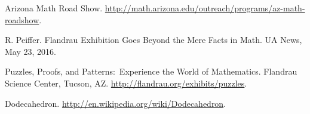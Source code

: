 \documentclass{article}
\begin{document}
\begin{thebibliography}{9}                                                                                  

Arizona Math Road Show. \url{http://math.arizona.edu/outreach/programs/az-math-roadshow}.

R. Peiffer. Flandrau Exhibition Goes Beyond the Mere Facts
in Math. UA News, May 23, 2016.

Puzzles, Proofs, and Patterns:\ Experience the World of
Mathematics. Flandrau Science Center, Tucson, AZ. \url{http://flandrau.org/exhibits/puzzles}.

 Dodecahedron. \url{http://en.wikipedia.org/wiki/Dodecahedron}.
\end{thebibliography}
\end{document}
